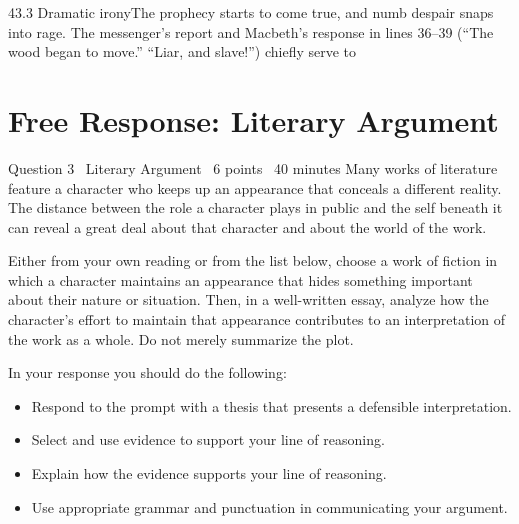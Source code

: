 \documentclass[11pt]{article}
\begin{document}
\begin{q}{4}{3.3 Dramatic irony}{The prophecy starts to come true, and numb despair snaps into rage.}
The messenger's report and Macbeth's response in lines 36--39 (``The wood began to move.'' ``Liar, and slave!'') chiefly serve to
\end{q}

\section{Free Response: Literary Argument}

\begin{frq}{Question 3 \textperiodcentered\ Literary Argument \textperiodcentered\ 6 points \textperiodcentered\ 40 minutes}
Many works of literature feature a character who keeps up an appearance that conceals a different reality. The distance between the role a character plays in public and the self beneath it can reveal a great deal about that character and about the world of the work.

Either from your own reading or from the list below, choose a work of fiction in which a character maintains an appearance that hides something important about their nature or situation. Then, in a well-written essay, analyze how the character's effort to maintain that appearance contributes to an interpretation of the work as a whole. Do not merely summarize the plot.

In your response you should do the following:
\begin{itemize}[leftmargin=1.4em]
\item Respond to the prompt with a thesis that presents a defensible interpretation.
\item Select and use evidence to support your line of reasoning.
\item Explain how the evidence supports your line of reasoning.
\item Use appropriate grammar and punctuation in communicating your argument.
\end{itemize}


\end{frq}
\end{document}
